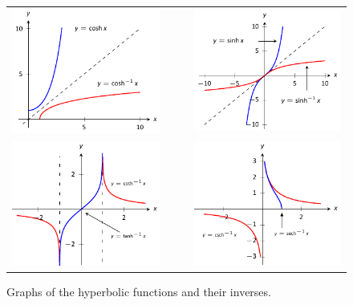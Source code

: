 \begin{figure} %
\begin{minipage}{1.3\textwidth}
\begin{tabular}{ccc}
\includegraphics[scale=0.95]{figures/fighfarccosh} & \ \hskip 15pt\ &\includegraphics[scale=0.95]{figures/fighfarcsinh}\\[15pt]
\includegraphics[scale=0.95]{figures/fighfarctanharccoth} & &\includegraphics[scale=0.95]{figures/fighfarcsecharccsch}
\end{tabular}
\captionsetup{type=figure}%
\caption{Graphs of the hyperbolic functions and their inverses.}\label{fig:hfinverse1}
\end{minipage}
\end{figure}

